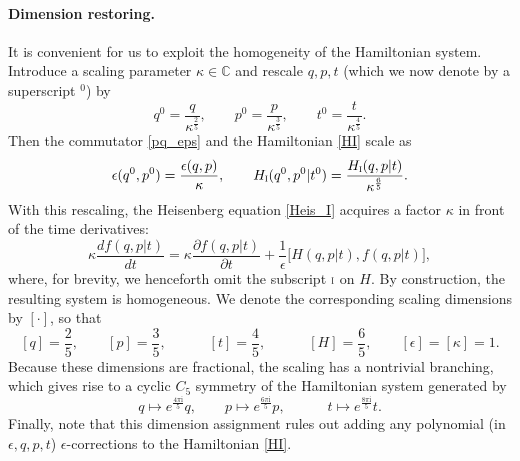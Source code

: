 \documentclass[12pt,a4paper]{article}
\numberwithin{equation}{section}
\newcommand{\I}{\scalebox{.6}{I}}
\newcommand{\ri}{\mathrm{i}}
\begin{document}
\paragraph{Dimension restoring.} It is convenient for us to exploit the homogeneity of the Hamiltonian system.
Introduce a scaling parameter $\kappa\in\mathbb{C}$ and rescale $q,p,t$ (which we now denote by a superscript ${}^{0}$) by
\begin{equation}
q^0=\frac{q}{\kappa^{\frac25}}, \qquad p^0=\frac{p}{\kappa^{\frac35}}, \qquad t^0=\frac{t}{\kappa^{\frac45}}.
\end{equation}
Then the commutator \eqref{pq_eps} and the Hamiltonian \eqref{HI} scale as
\begin{equation}
\epsilon(q^0,p^0)=\frac{\epsilon(q,p)}{\kappa}, \qquad
H_{\I}(q^0,p^0|t^0)=\frac{H_{\I}(q,p|t)}{\kappa^{\frac65}}.
\end{equation}
With this rescaling, the Heisenberg equation \eqref{Heis_I} acquires a factor $\kappa$ in front of the time derivatives:
\begin{equation}\label{Heis}
\kappa\frac{df(q,p|t)}{dt}=\kappa\frac{\partial f(q,p|t)}{\partial t}+\frac1{\epsilon}\big[H(q,p|t),f(q,p|t)\big], 
\end{equation}
where, for brevity, we henceforth omit the subscript $\I$ on $H$.
By construction, the resulting system is homogeneous. We denote the corresponding scaling dimensions by $[\cdot]$, so that
\begin{equation}\label{dim_I}
[q]=\frac25, \qquad [p]=\frac35, \qquad \quad [t]=\frac45, \qquad \quad [H]=\frac65, \qquad [\epsilon]=[\kappa]=1.    
\end{equation}
Because these dimensions are fractional, the scaling has a nontrivial branching, which gives rise to a cyclic $C_5$ symmetry of the Hamiltonian system generated by
\begin{equation}\label{C5_I}
q\mapsto e^{\frac{4\pi\ri}5} q, \qquad p\mapsto e^{\frac{6\pi\ri}5} p, \qquad \quad  t\mapsto e^{\frac{8\pi\ri}5} t.
\end{equation}
Finally, note that this dimension assignment rules out adding any polynomial (in $\epsilon,q,p,t$) $\epsilon$-corrections to the Hamiltonian \eqref{HI}.  
\end{document}
